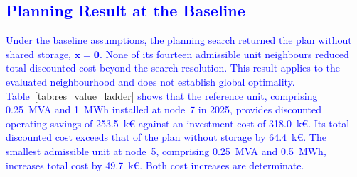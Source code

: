 \documentclass[preprint,12pt]{elsarticle}
\begin{document}
\subsection{\textcolor{blue}{Planning Result at the Baseline}}
\label{subsec:res_baseline}

\textcolor{blue}{
    Under the baseline assumptions, the planning search returned the plan without shared storage, $\boldsymbol{x}=\boldsymbol{0}$.
    None of its fourteen admissible unit neighbours reduced total discounted cost beyond the search resolution. This result applies to the evaluated neighbourhood and does not establish global optimality.
    Table~\ref{tab:res_value_ladder} shows that the reference unit, comprising 0.25~MVA and 1~MWh installed at node~7 in 2025, provides discounted operating savings of 253.5~k\euro{} against an investment cost of 318.0~k\euro{}. Its total discounted cost exceeds that of the plan without storage by 64.4~k\euro{}. The smallest admissible unit at node~5, comprising 0.25~MVA and 0.5~MWh, increases total cost by 49.7~k\euro{}. Both cost increases are determinate.
}
\end{document}
